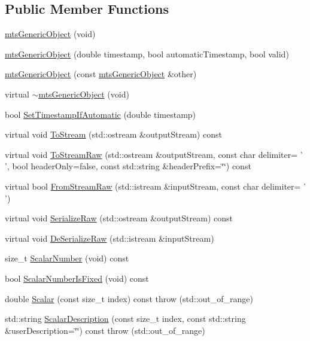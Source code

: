 \subsection*{Public Member Functions}
\begin{DoxyCompactItemize}
\item 
\hyperlink{classmts_generic_object_a8db6fa82ec6526194414c4c8bd9dee74}{mts\-Generic\-Object} (void)
\item 
\hyperlink{classmts_generic_object_a70bddbc580e56e7e127263febcad2ed8}{mts\-Generic\-Object} (double timestamp, bool automatic\-Timestamp, bool valid)
\item 
\hyperlink{classmts_generic_object_ade9d524eb6dc7ec1ec2507f91686442c}{mts\-Generic\-Object} (const \hyperlink{classmts_generic_object}{mts\-Generic\-Object} \&other)
\item 
virtual \hyperlink{classmts_generic_object_a1180fc7069c6f241f9be8449d45363d6}{$\sim$mts\-Generic\-Object} (void)
\item 
bool \hyperlink{classmts_generic_object_ad935c5369d451e6ce2ad17a08222bdcc}{Set\-Timestamp\-If\-Automatic} (double timestamp)
\item 
virtual void \hyperlink{classmts_generic_object_a2030aaa58bc215eccce1dc8d20dd0fdc}{To\-Stream} (std\-::ostream \&output\-Stream) const 
\item 
virtual void \hyperlink{classmts_generic_object_a4916a6c62ee5b167d7c93c88ab72523a}{To\-Stream\-Raw} (std\-::ostream \&output\-Stream, const char delimiter= ' ', bool header\-Only=false, const std\-::string \&header\-Prefix=\char`\"{}\char`\"{}) const 
\item 
virtual bool \hyperlink{classmts_generic_object_a975ee040ad3b033df2c4bbdbabc34ed4}{From\-Stream\-Raw} (std\-::istream \&input\-Stream, const char delimiter= ' ')
\item 
virtual void \hyperlink{classmts_generic_object_a33d4404a50a87243ca5a1e2b1913dd3b}{Serialize\-Raw} (std\-::ostream \&output\-Stream) const 
\item 
virtual void \hyperlink{classmts_generic_object_af83ae8622a742a5b94bf72e53d20a1cd}{De\-Serialize\-Raw} (std\-::istream \&input\-Stream)
\item 
size\-\_\-t \hyperlink{classmts_generic_object_aa4d6ee134316f5deb7eab2850d1899dc}{Scalar\-Number} (void) const 
\item 
bool \hyperlink{classmts_generic_object_a1b3f1cc0518413adde75adf8241878c5}{Scalar\-Number\-Is\-Fixed} (void) const 
\item 
double \hyperlink{classmts_generic_object_a1c7505fe283dbce64c13463b139119f5}{Scalar} (const size\-\_\-t index) const   throw (std\-::out\-\_\-of\-\_\-range)
\item 
std\-::string \hyperlink{classmts_generic_object_a029201af36af658834041599d250b4f6}{Scalar\-Description} (const size\-\_\-t index, const std\-::string \&user\-Description=\char`\"{}\char`\"{}) const   throw (std\-::out\-\_\-of\-\_\-range)
\end{DoxyCompactItemize}


